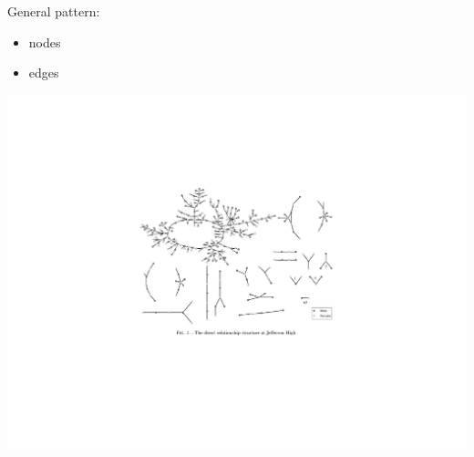 \documentclass[aspectratio=169]{beamer}
\begin{document}
\begin{frame}

General pattern:
\begin{itemize}
\item nodes
\item edges
\end{itemize}

\end{frame}
\begin{frame}

\begin{center}
\includegraphics[width=0.95\textheight]{figures/bearman_chains_2004_fig2}
\end{center}

\vfill
{}

\end{frame}
\end{document}
